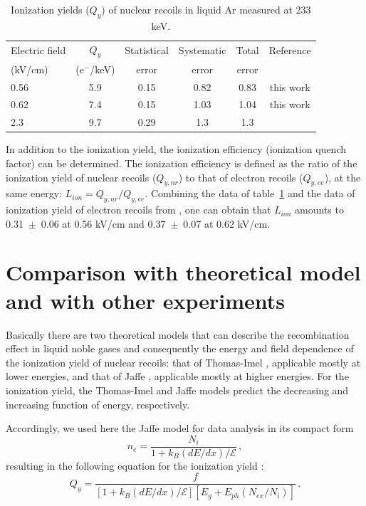 \documentclass[a4paper,11pt]{article}
\begin{document}
\begin{table}
\caption{Ionization yields ($Q_y$) of nuclear recoils in liquid Ar measured at 233 keV.}
\label{tab.1}
\begin{center}
\begin{tabular}{|lccccc|}
\hline
Electric field & $Q_y$ & Statistical & Systematic & Total & Reference\\
(kV/cm)& (e$^-$/keV) & error & error & error & \\ [2mm]\hline
0.56  & 5.9 & 0.15 & 0.82 & 0.83 & this work\\
0.62  & 7.4 & 0.15 & 1.03 & 1.04 & this work\\
2.3  & 9.7 & 0.29 & 1.3 & 1.3 & \cite{IonYield14} \\
\hline
\end{tabular}
\end{center}
\end{table}

In addition to the ionization yield, the ionization efficiency (ionization quench factor) can be determined. The ionization efficiency is defined as the ratio of the ionization yield
of nuclear recoils ($Q_{y,nr}$) to that of electron  recoils ($Q_{y,ee}$), at the same energy:
$L_{ion}=Q_{y,nr}/Q_{y,ee}$. Combining the data of table~\ref{tab.1} and the data of
ionization yield of electron recoils from \cite{XRayYield16}, one can obtain that $L_{ion}$ amounts to 0.31~$\pm$~0.06 at 0.56 kV/cm and 0.37~$\pm$~0.07 at 0.62 kV/cm.

\section{Comparison with theoretical model and with other experiments}

Basically there are two theoretical models that can describe the
recombination effect in liquid noble gases and consequently the
energy and field dependence of the ionization yield of nuclear
recoils: that of Thomas-Imel \cite{TIModel1,TIModel2}, applicable mostly at lower energies, and that of Jaffe \cite{JaffeModel1,JaffeModel2}, applicable mostly at higher energies. For the ionization yield, the Thomas-Imel and Jaffe models predict the decreasing and increasing function of energy, respectively.

Accordingly, we used here the Jaffe model for data analysis in its compact form \cite{JaffeModel2}
\begin{equation}
\label{eq.6} n_e=\frac{N_i}{1+k_B(dE/dx)/\mathcal{E}} \,,
\end{equation}
resulting in the following equation for the ionization yield \cite{IonYield14}:
\begin{equation}
\label{eq.7}
Q_y=\frac{f}{[1+k_B(dE/dx)/\mathcal{E}][E_g+E_{ph}(N_{ex}/N_i)]} \,.
\end{equation}
\end{document}
